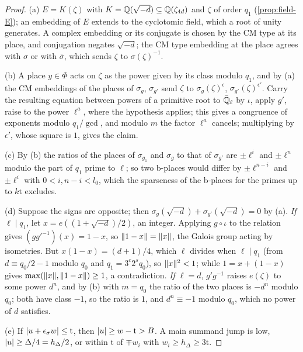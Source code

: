\begin{proof}
(a) $E=K(\zeta)$ with $K=\mathbb{Q}(\sqrt{-d})\subseteq\mathbb{Q}(\zeta_{4d})$ and $\zeta$ of order $q_1$ (\cref{prop:field-E}); an embedding of $E$ extends to the cyclotomic field, which a root of unity generates. A complex embedding or its conjugate is chosen by the
CM type at its place, and conjugation negates $\sqrt{-d}$; the CM type embedding at the place agrees with $\sigma$ or with $\bar\sigma$, which sends $\zeta$ to $\sigma(\zeta)^{-1}$.

(b) A place $y\in\Phi$ acts on $\zeta$ as the power given by its class modulo $q_1$, and by (a) the CM embeddings of the places of $\sigma_g$, $\sigma_{g'}$ send $\zeta$ to $\sigma_g(\zeta)^{\epsilon}$, $\sigma_{g'}(\zeta)^{\epsilon'}$. Carry the resulting equation between powers of a primitive root to
$\bar{\mathbb{Q}}_\ell$ by $\iota$, apply $g'$, raise to the power $\ell^a$, where the hypothesis applies; this gives a congruence of exponents modulo $q_1/\gcd$, and modulo $m$ the factor $\ell^a$ cancels; multiplying by $\epsilon'$, whose square is $1$, gives the claim.

(c) By (b) the ratios of the places of $\sigma_{g_1}$ and $\sigma_g$ to that of $\sigma_{g'}$ are $\pm\ell^i$ and $\pm\ell^n$ modulo the part of $q_1$ prime to $\ell$; so two b-places would differ by $\pm\ell^{n-i}$ and $\pm\ell^i$ with $0<i,n-i<l_0$, which the sparseness of
the b-places for the primes up to $k\mathrm t$ excludes.

(d) Suppose the signs are opposite; then $\sigma_g(\sqrt{-d})+\sigma_{g'}(\sqrt{-d})=0$ by (a). \emph{If $\ell\mid q_1$}, let $x=e((1+\sqrt{-d})/2)$, an integer. Applying $g\circ\iota$ to the relation gives $(gg'^{-1})(x)=1-x$, so $\lVert 1-x\rVert=\lVert x\rVert$, the Galois group
acting by isometries. But $x(1-x)=(d+1)/4$, which $\ell$ divides when $\ell\mid q_1$ (from $d\equiv q_0/2-1$ modulo $q_0$ and $q_1=3^c2^sq_0$), so $\lVert x\rVert^2<1$; while $1=x+(1-x)$ gives $\max(\lVert x\rVert,\lVert 1-x\rVert)\ge1$, a contradiction. \emph{If $\ell=d$},
$g'g^{-1}$ raises $e(\zeta)$ to some power $d^n$, and by (b) with $m=q_0$ the ratio of the two places is $-d^n$ modulo $q_0$; both have class $-1$, so the ratio is $1$, and $d^n\equiv-1$ modulo $q_0$, which no power of $d$ satisfies.

(e) If $\lvert u+\epsilon_\sigma w\rvert\le\mathrm t$, then $\lvert u\rvert\ge w-\mathrm t>B$. A main summand jump is low, $\lvert u\rvert\ge\Delta/4=h_\Delta/2$, or within $\mathrm t$ of $\mp w_i$ with $w_i\ge h_\Delta\ge3\mathrm t$.
\end{proof}

